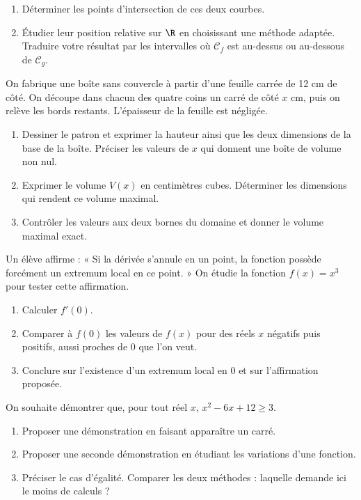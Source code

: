 \begin{enumerate}[label=\arabic*.]
\item Déterminer les points d’intersection de ces deux courbes.
\item Étudier leur position relative sur $\R$ en choisissant une méthode adaptée. Traduire votre résultat par les intervalles où $\mathcal C_f$ est au-dessus ou au-dessous de $\mathcal C_g$.
\end{enumerate}
On fabrique une boîte sans couvercle à partir d’une feuille carrée de 12 cm de côté. On découpe dans chacun des quatre coins un carré de côté $x$ cm, puis on relève les bords restants. L’épaisseur de la feuille est négligée.
\begin{enumerate}[label=\arabic*.]
\item Dessiner le patron et exprimer la hauteur ainsi que les deux dimensions de la base de la boîte. Préciser les valeurs de $x$ qui donnent une boîte de volume non nul.
\item Exprimer le volume $V(x)$ en centimètres cubes. Déterminer les dimensions qui rendent ce volume maximal.
\item Contrôler les valeurs aux deux bornes du domaine et donner le volume maximal exact.
\end{enumerate}
Un élève affirme : « Si la dérivée s’annule en un point, la fonction possède forcément un extremum local en ce point. » On étudie la fonction $f(x)=x^3$ pour tester cette affirmation.
\begin{enumerate}[label=\arabic*.]
\item Calculer $f\prime(0)$.
\item Comparer à $f(0)$ les valeurs de $f(x)$ pour des réels $x$ négatifs puis positifs, aussi proches de 0 que l’on veut.
\item Conclure sur l’existence d’un extremum local en 0 et sur l’affirmation proposée.
\end{enumerate}
On souhaite démontrer que, pour tout réel $x$, $x^2-6x+12\geq3$.
\begin{enumerate}[label=\arabic*.]
\item Proposer une démonstration en faisant apparaître un carré.
\item Proposer une seconde démonstration en étudiant les variations d’une fonction.
\item Préciser le cas d’égalité. Comparer les deux méthodes : laquelle demande ici le moins de calculs ?
\end{enumerate}
